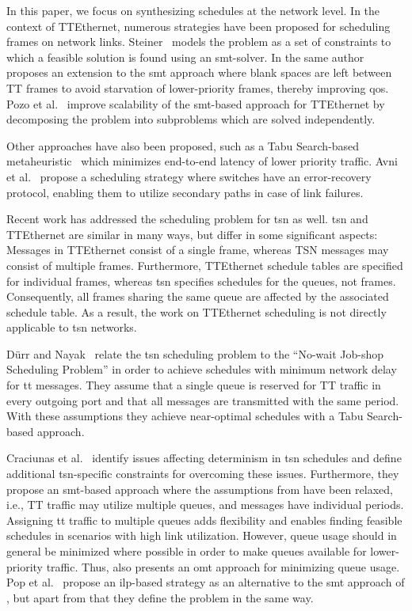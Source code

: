In this paper, we focus on synthesizing schedules at the network level.
In the context of TTEthernet, numerous strategies have been proposed for scheduling frames on network links.
Steiner~\cite{steiner2010} models the problem as a set of constraints to which a feasible solution is found using an \gls{smt}-solver.
In \cite{steiner2011} the same author proposes an extension to the \gls{smt} approach where blank spaces are left between TT frames to avoid starvation of lower-priority frames, thereby improving \gls{qos}. Pozo et al.~\cite{pozo2015} improve scalability of the \gls{smt}-based approach for TTEthernet by decomposing the problem into subproblems which are solved independently.

Other approaches have also been proposed, such as a Tabu Search-based metaheuristic~\cite{tamas2014} which minimizes end-to-end latency of lower priority traffic. Avni et al.~\cite{avni2016} propose a scheduling strategy where switches have an error-recovery protocol, enabling them to utilize secondary paths in case of link failures.

Recent work has addressed the scheduling problem for \gls{tsn} as well. \gls{tsn} and TTEthernet are similar in many ways, but differ in some significant aspects: Messages in TTEthernet consist of a single frame, whereas TSN messages may consist of multiple frames.
Furthermore, TTEthernet schedule tables are specified for individual frames, whereas \gls{tsn} specifies schedules for the queues, not frames.
Consequently, all frames sharing the same queue are affected by the associated schedule table.
As a result, the work on TTEthernet scheduling is not directly applicable to \gls{tsn} networks.

D{\"u}rr and Nayak~\cite{duerr16} relate the \gls{tsn} scheduling problem to the ``No-wait Job-shop Scheduling Problem'' in order to achieve schedules with minimum network delay for \gls{tt} messages. They assume that a single queue is reserved for TT traffic in every outgoing port and that all messages are transmitted with the same period. With these assumptions they achieve near-optimal schedules with a Tabu Search-based approach.

Craciunas et al.~\cite{craciunas16} identify issues affecting determinism in \gls{tsn} schedules and define additional \gls{tsn}-specific constraints for overcoming these issues.
Furthermore, they propose an \gls{smt}-based approach where the assumptions from \cite{duerr16} have been relaxed, i.e., TT traffic may utilize multiple queues, and messages have individual periods.
Assigning \gls{tt} traffic to multiple queues adds flexibility and enables finding feasible schedules in scenarios with high link utilization.
However, queue usage should in general be minimized where possible in order to make queues available for lower-priority traffic.
Thus, \cite{craciunas16} also presents an \gls{omt} approach for minimizing queue usage.
Pop et al.~\cite{pop16} propose an \gls{ilp}-based strategy as an alternative to the \gls{smt} approach of \cite{craciunas16}, but apart from that they define the problem in the same way.

